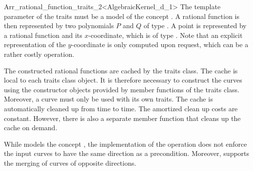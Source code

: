 \begin{ccRefClass}{Arr_rational_function_traits_2<AlgebraicKernel_d_1>}
The template parameter of the traits must be a model of the 
concept . 
A rational function is then represented by two polynomials $P$ and $Q$ of type 
. 
A point is represented by a rational function and its $x$-coordinate, which is 
of type . 
Note that an explicit representation of the $y$-coordinate is only computed upon 
request, which can be a rather costly operation. 


The constructed rational functions are cached by the traits class. 
The cache is local to each traits class object. 
It is therefore necessary to construct the curves using the constructor 
objects provided by member functions of the traits class. 
Moreover, a curve must only be used with its own traits. 
The cache is automatically  cleaned up from time to time.
The amortized clean up costs are constant. However, there is also a 
separate member function that cleans up the cache on demand.  

While \ccRefName{} models the concept
, the implementation of
the  operation does not enforce the input curves
to have the same direction as a precondition. Moreover, \ccRefName{}
supports the merging of curves of opposite directions.


\ccIsModel
  \\
  \\

\ccTypes
{} 
\ccGlue
{}\ccGlue
{}\ccGlue
{}\ccGlue
{}



\end{ccRefClass}
